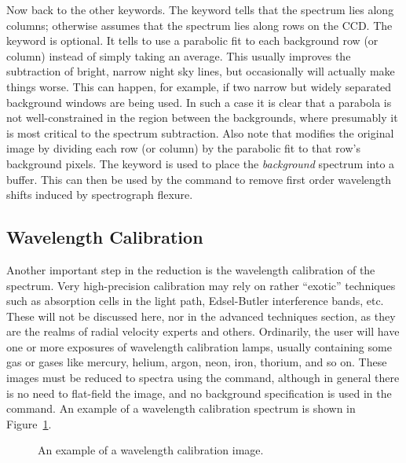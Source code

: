 Now back to the other  keywords.  The  keyword tells
 that the spectrum lies along columns; otherwise 
assumes that the spectrum lies along rows on the CCD.  The 
keyword is optional.  It tells  to use a parabolic fit to each
background row (or column) instead of simply taking an average.  This usually
improves the subtraction of bright, narrow night sky lines, but occasionally
 will actually make things worse.  This can happen, for example,
if two narrow but widely separated background windows are being used.  In such
a case it is clear that a parabola is not well-constrained in the region
between the backgrounds, where presumably it is most critical to the spectrum
subtraction.  Also note that  modifies the original image by
dividing each row (or column) by the parabolic fit to that row's background
pixels.  The  keyword is used to place the {\it background}
spectrum into a buffer.  This can then be used by the  command
to remove first order wavelength shifts induced by spectrograph flexure.

\subsection{Wavelength Calibration}

Another important step in the reduction is the wavelength calibration of the
spectrum.  Very high-precision calibration may rely on rather ``exotic''
techniques such as absorption cells in the light path, Edsel-Butler
interference bands, etc.  These will not be discussed here, nor in the
advanced techniques section, as they are the realms of radial velocity experts
and others.  Ordinarily, the user will have one or more exposures of
wavelength calibration lamps, usually containing some gas or gases like
mercury, helium, argon, neon, iron, thorium, and so on. These images must be
reduced to spectra using the  command, although in general there is
no need to flat-field the image, and no background specification is used in
the  command.  An example of a wavelength calibration spectrum is
shown in
Figure~\ref{fig:wavecal}.

\begin{figure}[t]
   \centering
   \vspace{4.0in}
   \caption[]{\label{fig:wavecal} An example of a wavelength calibration
	      image.}
\end{figure}


